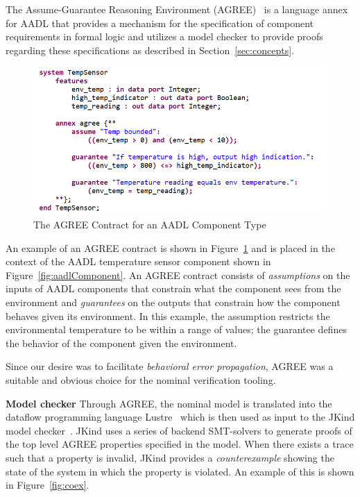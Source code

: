 The Assume-Guarantee Reasoning Environment (AGREE)~\cite{cofer2012compositional} is a language annex for AADL that provides a mechanism for the specification of component requirements in formal logic and utilizes a model checker to provide proofs regarding these specifications as described in Section~\ref{sec:concepts}. 

\begin{figure}[h!]
	\begin{center}
	\includegraphics[width=1.0\textwidth]{images/agreeContract2.png}
	\caption{The AGREE Contract for an AADL Component Type}
	\label{fig:agreeContract}
	\end{center}
\end{figure}

An example of an AGREE contract is shown in Figure~\ref{fig:agreeContract} and is placed in the context of the AADL temperature sensor component shown in Figure~\ref{fig:aadlComponent}.  An AGREE contract consists of {\em assumptions} on the inputs of AADL components that constrain what the component sees from the environment and {\em guarantees} on the outputs that constrain how the component behaves given its environment. In this example, the assumption restricts the environmental temperature to be within a range of values; the guarantee defines the behavior of the component given the environment. 

Since our desire was to facilitate {\em behavioral error propagation}, AGREE was a suitable and obvious choice for the nominal verification tooling. 

\textbf{Model checker} Through AGREE, the nominal model is translated into the dataflow programming language Lustre~\cite{Halbwachs91:IEEE} which is then used as input to the JKind model checker~\cite{2017arXiv171201222G}. JKind uses a series of backend SMT-solvers to generate proofs of the top level AGREE properties specified in the model. When there exists a trace such that a property is invalid, JKind provides a {\em counterexample} showing the state of the system in which the property is violated. An example of this is shown in Figure~\ref{fig:coex}. 

